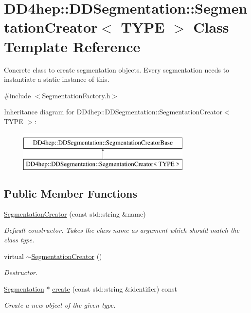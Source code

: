 \hypertarget{class_d_d4hep_1_1_d_d_segmentation_1_1_segmentation_creator}{}\section{D\+D4hep\+:\+:D\+D\+Segmentation\+:\+:Segmentation\+Creator$<$ T\+Y\+PE $>$ Class Template Reference}
\label{class_d_d4hep_1_1_d_d_segmentation_1_1_segmentation_creator}


Concrete class to create segmentation objects. Every segmentation needs to instantiate a static instance of this.  




{\ttfamily \#include $<$Segmentation\+Factory.\+h$>$}

Inheritance diagram for D\+D4hep\+:\+:D\+D\+Segmentation\+:\+:Segmentation\+Creator$<$ T\+Y\+PE $>$\+:\begin{figure}[H]
\begin{center}
\leavevmode
\includegraphics[height=2.000000cm]{class_d_d4hep_1_1_d_d_segmentation_1_1_segmentation_creator}
\end{center}
\end{figure}
\subsection*{Public Member Functions}
\begin{DoxyCompactItemize}
\item 
\hyperlink{class_d_d4hep_1_1_d_d_segmentation_1_1_segmentation_creator_aa260ef2741fe49696c70711f03c646cc}{Segmentation\+Creator} (const std\+::string \&name)
\begin{DoxyCompactList}\small\item\em Default constructor. Takes the class name as argument which should match the class type. \end{DoxyCompactList}\item 
virtual \hyperlink{class_d_d4hep_1_1_d_d_segmentation_1_1_segmentation_creator_abb405dd7c3a0092bfc072e8564dda6af}{$\sim$\+Segmentation\+Creator} ()
\begin{DoxyCompactList}\small\item\em Destructor. \end{DoxyCompactList}\item 
\hyperlink{class_d_d4hep_1_1_d_d_segmentation_1_1_segmentation}{Segmentation} $\ast$ \hyperlink{class_d_d4hep_1_1_d_d_segmentation_1_1_segmentation_creator_a4d5669cfa65ace8d57f54a04af55e5e2}{create} (const std\+::string \&identifier) const
\begin{DoxyCompactList}\small\item\em Create a new object of the given type. \end{DoxyCompactList}\end{DoxyCompactItemize}


